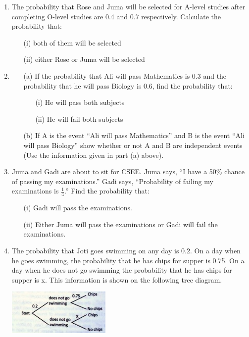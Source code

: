 \begin{enumerate}
	\item The probability that Rose and Juma will be selected for A-level studies after completing O-level studies are 0.4 and 0.7 respectively. Calculate the probability that:
	\begin{itemize}
	\item[(i)] both of them will be selected
	\item[(ii)] either Rose or Juma will be selected
	\end{itemize}
	
	\item 
	\begin{itemize}
	\item[(a)] If the probability that Ali will pass Mathematics is 0.3 and the probability that he will pass Biology is 0.6, find the probability that:
		\begin{itemize}
		\item[(i)] He will pass both subjects
		\item[(ii)] He will fail both subjects
		\end{itemize}
	\item[(b)] If A is the event ``Ali will pass Mathematics'' and B is the event ``Ali will pass Biology'' show whether or not A and B are independent events (Use the information given in part (a) above).
	\end{itemize}
	
	\item Juma and Gadi are about to sit for CSEE. Juma says, ``I have a 50\% chance of passing my examinations.'' Gadi says, ``Probability of failing my examinations is $\frac{1}{4}$.'' Find the probability that:
		\begin{itemize}
		\item[(i)] Gadi will pass the examinations.
		\item[(ii)] Either Juma will pass the examinations or Gadi will fail the examinations.
		\end{itemize}

	\item The probability that Joti goes swimming on any day is 0.2. On a day when he goes swimming, the probability that he has chips for supper is 0.75. On a day when he does not go swimming the probability that he has chips for supper is x. This information is shown on the following tree diagram.
	\begin{center}
	\includegraphics[width=5cm]{./img/prob1.jpg}
	\end{center}
	

\end{enumerate}
